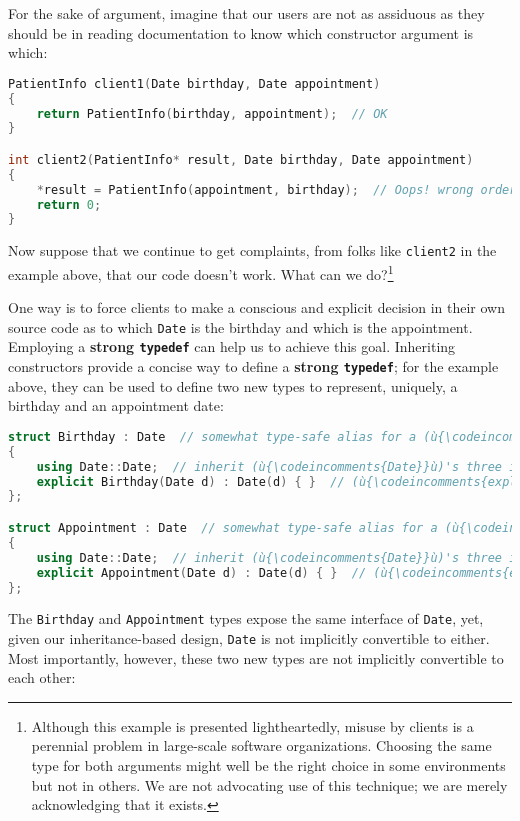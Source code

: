 \noindent For the sake of argument, imagine that our users are not as assiduous as
they should be in reading documentation to know which constructor
argument is which:

\begin{lstlisting}[language=C++]
PatientInfo client1(Date birthday, Date appointment)
{
    return PatientInfo(birthday, appointment);  // OK
}

int client2(PatientInfo* result, Date birthday, Date appointment)
{
    *result = PatientInfo(appointment, birthday);  // Oops! wrong order
    return 0;
}
\end{lstlisting}

\noindent Now suppose that we continue to get complaints, from folks like
\texttt{client2} in the example above, that our code doesn't work. What can we
do?{\cprotect\footnote{Although this example is presented lightheartedly, misuse by clients is a perennial problem in large-scale
software organizations. Choosing the same type for both arguments
might well be the right choice in some environments but not in others.
We are not advocating use of this technique; we are merely
  acknowledging that it exists.}}

One way is to force clients to make a conscious and explicit decision in
their own source code as to which \texttt{Date} is the birthday and
which is the appointment. Employing a \textbf{strong \texttt{typedef}}
can help us to achieve this goal. Inheriting constructors provide a
concise way to define a \textbf{strong \texttt{typedef}}; for
the example above, they can be used to define two new types to
represent, uniquely, a birthday and an appointment date:

\begin{lstlisting}[language=C++]
struct Birthday : Date  // somewhat type-safe alias for a (ù{\codeincomments{Date}}ù)
{
    using Date::Date;  // inherit (ù{\codeincomments{Date}}ù)'s three integer ctor
    explicit Birthday(Date d) : Date(d) { }  // (ù{\codeincomments{explicit}}ù) conversion from (ù{\codeincomments{Date}}ù)
};

struct Appointment : Date  // somewhat type-safe alias for a (ù{\codeincomments{Date}}ù)
{
    using Date::Date;  // inherit (ù{\codeincomments{Date}}ù)'s three integer ctor
    explicit Appointment(Date d) : Date(d) { }  // (ù{\codeincomments{explicit}}ù) conv. from (ù{\codeincomments{Date}}ù)
};
\end{lstlisting}

\noindent The \texttt{Birthday} and \texttt{Appointment} types expose the same
interface of \texttt{Date}, yet, given our inheritance-based design,
\texttt{Date} is not implicitly convertible to either. Most importantly,
however, these two new types are not implicitly convertible to each
other:

